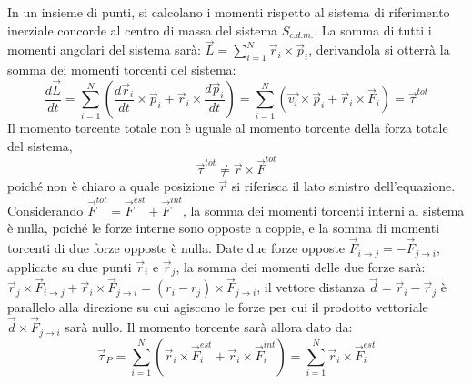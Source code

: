 \documentclass{article}
\numberwithin{equation}{subsection}
\begin{document}
In un insieme di punti, si calcolano i momenti rispetto 
al sistema di riferimento inerziale concorde al centro 
di massa del sistema $S_{c.d.m.}$. La somma 
di tutti i momenti angolari del sistema sarà: $\vec{L}=\displaystyle\sum_{i=1}^{N}\vec{r}_i\times\vec{p}_i$, 
derivandola si otterrà la somma dei momenti torcenti 
del sistema: 
\begin{equation}
    \displaystyle\frac{d\vec{L}}{dt}=\sum_{i=1}^{N}\left(\frac{d\vec{r}_i}{dt}\times\vec{p}_i+\vec{r}_i\times\frac{d\vec{p}_i}{dt}\right)=\sum_{i=1}^{N}(\vec{v_i}\times\vec{p}_i+\vec{r}_i\times\vec{F}_i)=\vec{\tau}^{tot}
\end{equation}
Il momento torcente totale non è uguale al momento torcente 
della forza totale del sistema, 
\begin{equation}
    \vec{\tau}^{tot}\neq\vec{r}\times\vec{F}^{tot}
\end{equation}
poiché non è chiaro a quale posizione $\vec{r}$ si riferisca il lato 
sinistro dell'equazione. 
Considerando $\vec{F}^{tot}=\vec{F}^{est}+\vec{F}^{int}$, la 
somma dei momenti torcenti interni al sistema è nulla, poiché 
le forze interne sono opposte a coppie, e la somma di momenti 
torcenti di due forze opposte è nulla. Date due forze opposte 
$\vec{F}_{i\to j}=-\vec{F}_{j\to i}$, applicate su due punti 
$\vec{r}_i$ e $\vec{r}_j$, la somma dei momenti delle due forze 
sarà: $\vec{r}_j\times\vec{F}_{i\to j}+\vec{r}_i\times\vec{F}_{j\to i}=(r_i-r_j)\times\vec{F}_{j\to i}$, 
il vettore distanza $\vec{d}=\vec{r}_i-\vec{r}_j$ è parallelo 
alla direzione su cui agiscono le forze per cui il prodotto 
vettoriale $\vec{d}\times\vec{F}_{j\to i}$ sarà nullo. 
Il momento torcente sarà allora dato da:
\begin{equation}
    \vec{\tau}_P=\displaystyle\sum_{i=1}^{N}(\vec{r}_i\times\vec{F}^{est}_i+\vec{r}_i\times\vec{F}^{int}_i)=\sum_{i=1}^{N}\vec{r}_i\times\vec{F}^{est}_i
\end{equation}
\begin{center}\end{center}
\end{document}
